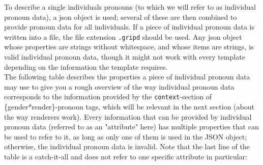 \documentclass{article}
\begin{document}
    To describe a single individuals pronouns (to which we will refer to as individual pronoun data), a json object is used;
    several of these are then combined to provide pronoun data for all individuals.
    If a piece of individual pronoun data is written into a file, the file extension \texttt{.gripd} should be used.
    Any json object whose properties are strings without whitespace, and whose items are strings, is valid individual pronoun data, though it might not work with every template depending on the information the template requires.\\

    The following table describes the properties a piece of individual pronoun data may use to give you a rough overview of the way individual pronoun data corresponds to the information provided by the \texttt{context}-section of \{gender*render\}-pronoun tags, which will be relevant in the next section (about the way renderers work).
    Every information that can be provided by individual pronoun data (referred to as an "attribute" here) has multiple properties that can be used to refer to it, as long as only one of them is used in the JSON object;
   otherwise, the individual pronoun data is invalid.
    Note that the last line of the table is a catch-it-all and does not refer to one specific attribute in particular:
\end{document}
